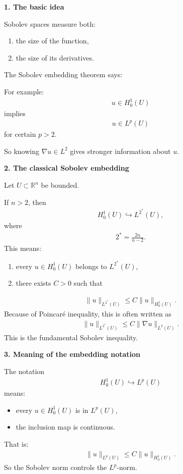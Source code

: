 \documentclass[12pt,a4paper]{report}
\begin{document}
\begin{description}
\begin{description}
\item \textbf{1. The basic idea}

Sobolev spaces measure both:

\begin{enumerate}
\item the size of the function,
\item the size of its derivatives.
\end{enumerate}
The Sobolev embedding theorem says:

\> 

For example:
\begin{align*}
u\in H_0^1(U)
\end{align*}
implies
\begin{align*}
u\in L^p(U)
\end{align*}
for certain $p>2$.

So knowing $\nabla u\in L^2$ gives stronger information about $u$.

\item \textbf{2. The classical Sobolev embedding}

Let $U\subset \mathbb R^n$ be bounded.

If $n>2$, then
\begin{align*}
H_0^1(U)\hookrightarrow L^{2^*}(U),
\end{align*}
where
\begin{align*}
2^*=\frac{2n}{n-2}.
\end{align*}
This means:
\begin{enumerate}
\item every $u\in H_0^1(U)$ belongs to $L^{2^*}(U)$,
\item there exists $C>0$ such that
\end{enumerate}
\begin{align*}
\|u\|_{L^{2^*}(U)} \le C\|u\|_{H_0^1(U)}.
\end{align*}
Because of Poincaré inequality, this is often written as
\begin{align*}
\|u\|_{L^{2^*}(U)} \le C\|\nabla u\|_{L^2(U)}.
\end{align*}
This is the fundamental Sobolev inequality.

\item \textbf{3. Meaning of the embedding notation}

The notation
\begin{align*}
H_0^1(U)\hookrightarrow L^p(U)
\end{align*}
means:
\begin{itemize}
\item every $u\in H_0^1(U)$ is in $L^p(U)$,
\item the inclusion map is continuous.
\end{itemize}
That is:
\begin{align*}
\|u\|_{L^p(U)} \le C\|u\|_{H_0^1(U)}.
\end{align*}
So the Sobolev norm controls the $L^p$-norm.


\end{description}
\end{description}
\end{document}
